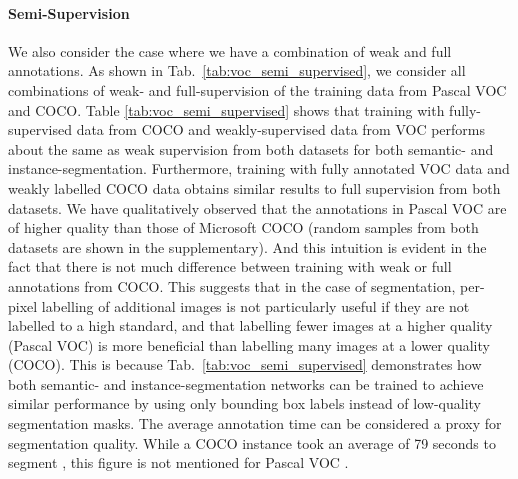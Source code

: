 \documentclass[runningheads]{llncs}
\begin{document}
\paragraph{Semi-Supervision}
We also consider the case where we have a combination of weak and full annotations.
As shown in Tab.~\ref{tab:voc_semi_supervised}, we consider all combinations of weak- and full-supervision of the training data from Pascal VOC and COCO.
Table \ref{tab:voc_semi_supervised} shows that training with fully-supervised data from COCO and weakly-supervised data from VOC performs about the same as weak supervision from both datasets for both semantic- and instance-segmentation.
Furthermore, training with fully annotated VOC data and weakly labelled COCO data obtains similar results to full supervision from both datasets.
We have qualitatively observed that the annotations in Pascal VOC are of higher quality than those of Microsoft COCO (random samples from both datasets are shown in the supplementary).
And this intuition is evident in the fact that there is not much difference between training with weak or full annotations from COCO.
This suggests that in the case of segmentation, per-pixel labelling of additional images is not particularly useful if they are not labelled to a high standard, and that labelling fewer images at a higher quality (Pascal VOC) is more beneficial than labelling many images at a lower quality (COCO).
This is because Tab.~\ref{tab:voc_semi_supervised} demonstrates how both semantic- and instance-segmentation networks can be trained to achieve similar performance by using only bounding box labels instead of low-quality segmentation masks.
The average annotation time can be considered a proxy for segmentation quality. 
While a COCO instance took an average of 79 seconds to segment \cite{lin_2014}, this figure is not mentioned for Pascal VOC \cite{everingham_2010,everingham_ijcv_2015}.
\end{document}

